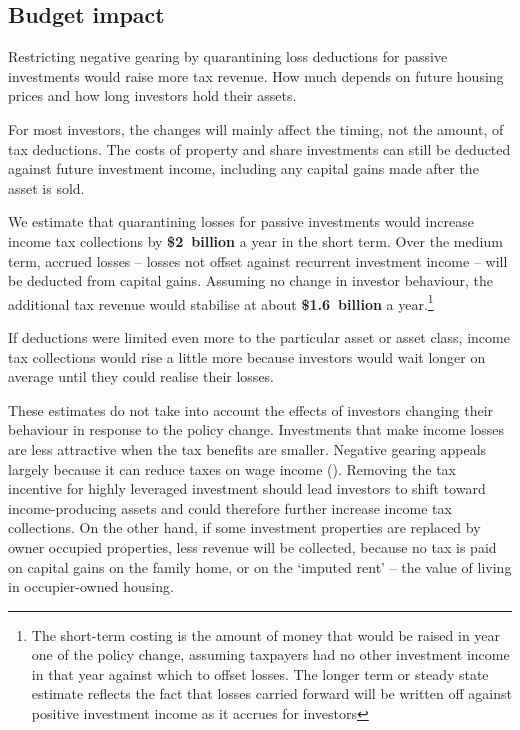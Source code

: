 \documentclass{grattanAlpha}\usepackage[]{graphicx}\usepackage[]{color}
\begin{document}
\subsection{Budget impact}
Restricting negative gearing by quarantining loss deductions for passive investments would raise more tax revenue. How much depends on future housing prices and how long investors hold their assets.

For most investors, the changes will mainly affect the timing, not the amount, of tax deductions. The costs of property and share investments can still be deducted against future investment income, including any capital gains made after the asset is sold.

We estimate that quarantining losses for passive investments would increase income tax collections by \textbf{\$2~billion} a year in the short term. Over the medium term, accrued losses – losses not offset against recurrent investment income – will be deducted from capital gains. Assuming no change in investor behaviour, the additional tax revenue would stabilise at about \textbf{\$1.6~billion} a year.\footnote{The short-term costing is the amount of money that would be raised in year one of the policy change, assuming taxpayers had no other investment income in that year against which to offset losses. The longer term or steady state estimate reflects the fact that losses carried forward will be written off against positive investment income as it accrues for investors} 

If deductions were limited even more to the particular asset or asset class, income tax collections would rise a little more because investors would wait longer on average until they could realise their losses. 

These estimates do not take into account the effects of investors changing their behaviour in response to the policy change. Investments that make income losses are less attractive when the tax benefits are smaller. Negative gearing appeals largely because it can reduce taxes on wage income (). Removing the tax incentive for highly leveraged investment should lead investors to shift toward income-producing assets and could therefore further increase income tax collections. On the other hand, if some investment properties are replaced by owner occupied properties, less revenue will be collected, because no tax is paid on capital gains on the family home, or on the ‘imputed rent’ – the value of living in occupier-owned housing.
\end{document}
